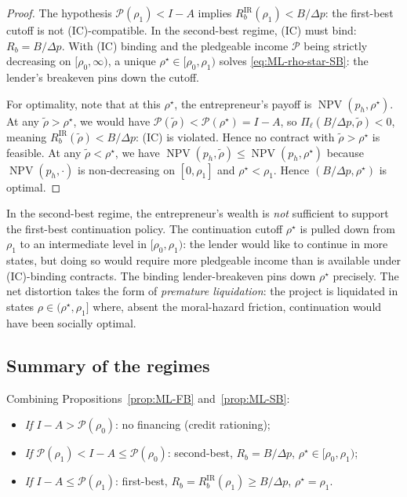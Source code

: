 \documentclass[11pt,a4paper,oneside]{book}
\def\leq{\leqslant}
\def\geq{\geqslant}
\DeclareMathOperator{\NPV}{NPV}
\newcommand{\IR}{\mathrm{IR}}
\theoremstyle{plain}
\theoremstyle{definition}
\theoremstyle{remark}
\numberwithin{equation}{chapter}
\begin{document}
\begin{proof}
The hypothesis $\mathcal{P}(\rho_1) < I - A$ implies $R_b^{\IR}(\rho_1) < B/\Delta p$: the first-best cutoff is not (IC)-compatible.
In the second-best regime, (IC) must bind: $R_b = B/\Delta p$.
With (IC) binding and the pledgeable income $\mathcal{P}$ being strictly decreasing on $[\rho_0, \infty)$, a unique $\rho^\star \in [\rho_0, \rho_1)$ solves \eqref{eq:ML-rho-star-SB}: the lender's breakeven pins down the cutoff.

For optimality, note that at this $\rho^\star$, the entrepreneur's payoff is $\NPV(p_h, \rho^\star)$.
At any $\widetilde{\rho} > \rho^\star$, we would have $\mathcal{P}(\widetilde{\rho}) < \mathcal{P}(\rho^\star) = I - A$, so $\Pi_\ell(B/\Delta p, \widetilde{\rho}) < 0$, meaning $R_b^{\IR}(\widetilde{\rho}) < B/\Delta p$: (IC) is violated.
Hence no contract with $\widetilde{\rho} > \rho^\star$ is feasible.
At any $\widetilde{\rho} < \rho^\star$, we have $\NPV(p_h, \widetilde{\rho}) \leq \NPV(p_h, \rho^\star)$ because $\NPV(p_h, \cdot)$ is non-decreasing on $[0, \rho_1]$ and $\rho^\star < \rho_1$.
Hence $(B/\Delta p, \rho^\star)$ is optimal.
\end{proof}

In the second-best regime, the entrepreneur's wealth is \emph{not} sufficient to support the first-best continuation policy.
The continuation cutoff $\rho^\star$ is pulled down from $\rho_1$ to an intermediate level in $[\rho_0, \rho_1)$: the lender would like to continue in more states, but doing so would require more pledgeable income than is available under (IC)-binding contracts.
The binding lender-breakeven pins down $\rho^\star$ precisely.
The net distortion takes the form of \emph{premature liquidation}: the project is liquidated in states $\rho \in (\rho^\star, \rho_1]$ where, absent the moral-hazard friction, continuation would have been socially optimal.

\subsection{Summary of the regimes}

Combining Propositions~\ref{prop:ML-FB} and~\ref{prop:ML-SB}:

\begin{itemize}
  \item \emph{If $I - A > \mathcal{P}(\rho_0)$}: no financing (credit rationing);
  \item \emph{If $\mathcal{P}(\rho_1) < I - A \leq \mathcal{P}(\rho_0)$}: second-best, $R_b = B/\Delta p$, $\rho^\star \in [\rho_0, \rho_1)$;
  \item \emph{If $I - A \leq \mathcal{P}(\rho_1)$}: first-best, $R_b = R_b^{\IR}(\rho_1) \geq B/\Delta p$, $\rho^\star = \rho_1$.
\end{itemize}
\end{document}
